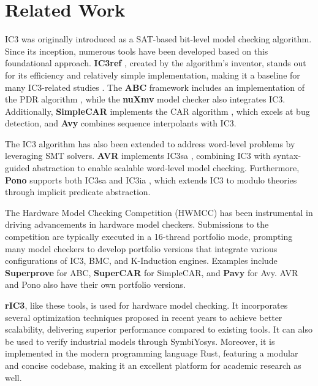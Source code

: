 \section{Related Work}
IC3 was originally introduced as a SAT-based bit-level model checking algorithm. Since its inception, numerous tools have been developed based on this foundational approach. \textbf{IC3ref} \cite{IC3ref}, created by the algorithm’s inventor, stands out for its efficiency and relatively simple implementation, making it a baseline for many IC3-related studies \cite{DeepIC3,Progress,PredictingLemma,IGoodLemma}. The \textbf{ABC} framework \cite{ABC} includes an implementation of the PDR algorithm \cite{PDR}, while the \textbf{nuXmv} model checker \cite{NUXMV} also integrates IC3. Additionally, \textbf{SimpleCAR} \cite{SimpleCAR} implements the CAR algorithm \cite{CAR}, which excels at bug detection, and \textbf{Avy} \cite{Avy} combines sequence interpolants with IC3.

The IC3 algorithm has also been extended to address word-level problems by leveraging SMT solvers. \textbf{AVR} \cite{AVR} implements IC3sa \cite{IC3SA}, combining IC3 with syntax-guided abstraction to enable scalable word-level model checking. Furthermore, \textbf{Pono} \cite{PONO} supports both IC3sa and IC3ia \cite{IC3IA}, which extends IC3 to modulo theories through implicit predicate abstraction.

The Hardware Model Checking Competition (HWMCC) \cite{HWMCC} has been instrumental in driving advancements in hardware model checkers. Submissions to the competition are typically executed in a 16-thread portfolio mode, prompting many model checkers to develop portfolio versions that integrate various configurations of IC3, BMC, and K-Induction engines. Examples include \textbf{Superprove} \cite{SuperProve} for ABC, \textbf{SuperCAR} \cite{SuperCAR} for SimpleCAR, and \textbf{Pavy} \cite{Pavy} for Avy. AVR and Pono also have their own portfolio versions.

\textbf{rIC3}, like these tools, is used for hardware model checking. It incorporates several optimization techniques proposed in recent years to achieve better scalability, delivering superior performance compared to existing tools. It can also be used to verify industrial models through SymbiYosys. Moreover, it is implemented in the modern programming language Rust, featuring a modular and concise codebase, making it an excellent platform for academic research as well.